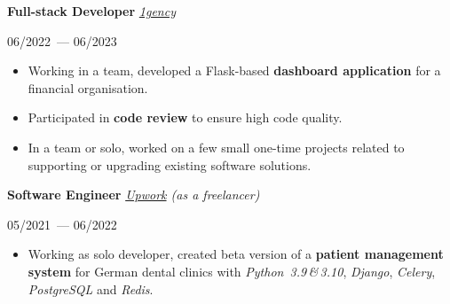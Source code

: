 \documentclass[10pt]{article}
\def\leftcolumnwidth{0.3\textwidth}
\begin{document}
\begin{minipage}[t]{\textwidth - \leftcolumnwidth - 6pt}
    \vspace{1em}

    \textbf{Full-stack Developer}
    \hfill
    \textit{\href{https://1gency.ee/}{1gency}}

    \vspace{1em}

    \begin{minipage}{0.25\textwidth}
        06/2022~--- 06/2023
    \end{minipage}
    \begin{minipage}{0.75\textwidth}

        \begin{itemize}[topsep=4pt,parsep=0pt,leftmargin=*]
            \item
            \raggedright
            Working in a team, developed a Flask-based \textbf{dashboard application} for a financial organisation.

            \item
            \raggedright
            Participated in \textbf{code review} to ensure high code quality.

            \item
            \raggedright
            In a team or solo, worked on a few small one-time projects related to supporting or upgrading existing software solutions.
        \end{itemize}
    \end{minipage}

    \vspace{1em}

    \textbf{Software Engineer}
    \hfill
    \textit{\href{https://upwork.com/}{Upwork} (as a freelancer)}

    \vspace{1em}

    \begin{minipage}{0.25\textwidth}
        05/2021~--- 06/2022
    \end{minipage}
    \begin{minipage}{0.75\textwidth}

        \begin{itemize}[topsep=4pt,parsep=0pt,leftmargin=*]
            \item
            \raggedright
            Working as solo developer, created beta version of a \textbf{patient management system} for German dental clinics with
            \textit{Python~3.9\,\&\,3.10}, \textit{Django}, \textit{Celery}, \textit{PostgreSQL} and \textit{Redis}.
        \end{itemize}
    \end{minipage}


\end{minipage}
\end{document}
